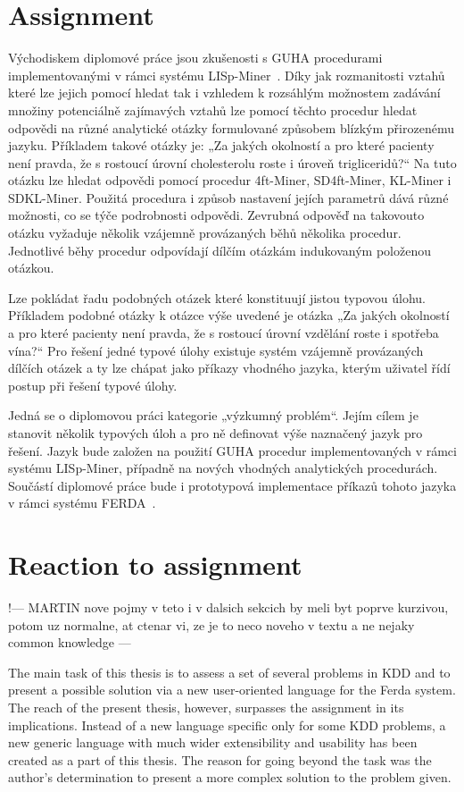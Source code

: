\documentclass[a4paper,12pt]{book}
\begin{document}
\section{Assignment}
Východiskem diplomové práce jsou zkušenosti s GUHA procedurami implementovanými v rámci systému LISp-Miner~\cite{GMGC}. Díky jak rozmanitosti vztahů které lze jejich pomocí hledat tak i vzhledem k rozsáhlým možnostem zadávání množiny potenciálně zajímavých vztahů lze pomocí těchto procedur hledat odpovědi na různé analytické otázky formulované způsobem blízkým přirozenému jazyku. Příkladem takové otázky je: „Za jakých okolností a pro které pacienty není pravda, že s rostoucí úrovní cholesterolu roste i úroveň trigliceridů?“ Na tuto otázku lze hledat odpovědi pomocí procedur 4ft-Miner, SD4ft-Miner, KL-Miner i SDKL-Miner. Použitá procedura i způsob nastavení jejích parametrů dává různé možnosti, co se týče podrobnosti odpovědi. Zevrubná odpověď na takovouto otázku vyžaduje několik vzájemně provázaných běhů několika procedur. Jednotlivé běhy procedur odpovídají dílčím otázkám indukovaným položenou otázkou.

Lze pokládat řadu podobných otázek které konstituují jistou typovou úlohu. Příkladem podobné otázky k otázce výše uvedené je otázka „Za jakých okolností a pro které pacienty není pravda, že s rostoucí úrovní vzdělání roste i spotřeba vína?“ Pro řešení jedné typové úlohy existuje systém vzájemně provázaných dílčích otázek a ty lze chápat jako příkazy vhodného jazyka, kterým uživatel řídí postup při řešení typové úlohy.

Jedná se o diplomovou práci kategorie „výzkumný problém“. Jejím cílem je stanovit několik typových úloh a pro ně definovat výše naznačený jazyk pro řešení. Jazyk bude založen na použití GUHA procedur implementovaných v rámci systému LISp-Miner, případně na nových vhodných analytických procedurách. Součástí diplomové práce bude i prototypová implementace příkazů tohoto jazyka v rámci systému FERDA~\cite{znalosti2006}.

\section{Reaction to assignment}
!--- MARTIN nove pojmy v teto i v dalsich sekcich by meli byt poprve kurzivou, potom uz normalne, at ctenar vi, ze je to neco noveho v textu a ne nejaky common knowledge ---

The main task of this thesis is to assess a set of several problems in KDD and to present a possible solution via a new user-oriented language for the Ferda system. The reach of the present thesis, however, surpasses the assignment in its implications. Instead of a new language specific only for some KDD problems, a new generic language with much wider extensibility and usability has been created as a part of this thesis. The reason for going beyond the task was the author's determination to present a more complex solution to the problem given. 
\end{document}
